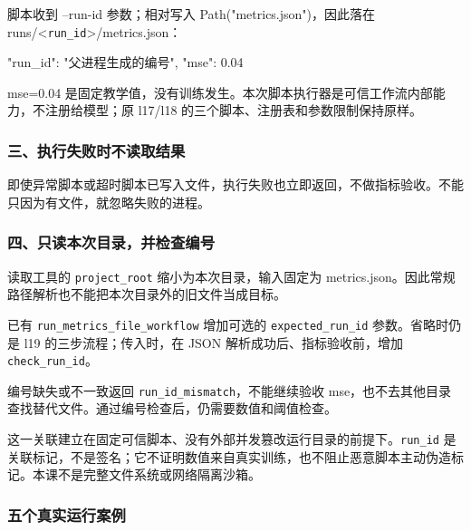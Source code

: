 脚本收到 --run-id 参数；相对写入 Path("metrics.json")，因此落在 runs/<\nolinkurl{run_id}>/metrics.json：

\begin{Code}
{"run_id": "父进程生成的编号", "mse": 0.04}
\end{Code}

mse=0.04 是固定教学值，没有训练发生。本次脚本执行器是可信工作流内部能力，不注册给模型；原 l17/l18 的三个脚本、注册表和参数限制保持原样。

\subsubsection{三、执行失败时不读取结果}

即使异常脚本或超时脚本已写入文件，执行失败也立即返回，不做指标验收。不能只因为有文件，就忽略失败的进程。

\subsubsection{四、只读本次目录，并检查编号}

读取工具的 \nolinkurl{project_root} 缩小为本次目录，输入固定为 metrics.json。因此常规路径解析也不能把本次目录外的旧文件当成目标。

已有 \nolinkurl{run_metrics_file_workflow} 增加可选的 \nolinkurl{expected_run_id} 参数。省略时仍是 l19 的三步流程；传入时，在 JSON 解析成功后、指标验收前，增加 \nolinkurl{check_run_id}。

编号缺失或不一致返回 \nolinkurl{run_id_mismatch}，不能继续验收 mse，也不去其他目录查找替代文件。通过编号检查后，仍需要数值和阈值检查。

这一关联建立在固定可信脚本、没有外部并发篡改运行目录的前提下。\nolinkurl{run_id} 是关联标记，不是签名；它不证明数值来自真实训练，也不阻止恶意脚本主动伪造标记。本课不是完整文件系统或网络隔离沙箱。

\subsubsection{五个真实运行案例}

